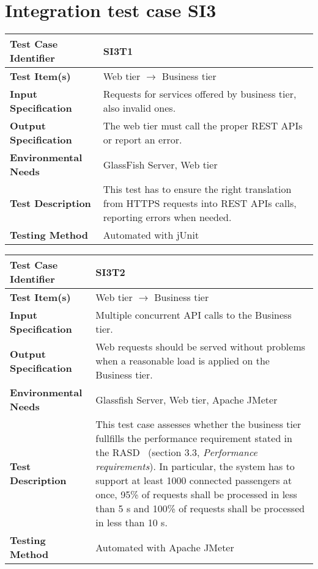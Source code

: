 \vspace{2em}

\section{Integration test case SI3}

\begin{tabular}{l p{}}
    \hline
    \textbf{Test Case Identifier} & SI3T1\\
    \hline
    \textbf{Test Item(s)} & Web tier $\rightarrow$ Business tier\\
    \hline
    \textbf{Input Specification} & Requests for services offered by business tier, also invalid ones.\\
    \hline
    \textbf{Output Specification} & The web tier must call the proper REST APIs or report an error. \\
    \hline
    \textbf{Environmental Needs} & GlassFish Server, Web tier\\
    \hline
    \textbf{Test Description} & This test has to ensure the right translation from HTTPS requests into REST APIs calls, reporting errors when needed.\\
    \hline
    \textbf{Testing Method} & Automated with jUnit \\
    \hline
\end{tabular}

\vspace{2em}

\noindent\begin{tabular}{l p{}}
    \hline
    \textbf{Test Case Identifier} & SI3T2\\
    \hline
    \textbf{Test Item(s)} & Web tier $\rightarrow$ Business tier\\
    \hline
    \textbf{Input Specification} & Multiple concurrent API calls to the Business tier.\\
    \hline
    \textbf{Output Specification} & Web requests should be served without problems when a reasonable load is applied on the Business tier. \\
    \hline
    \textbf{Environmental Needs} & Glassfish Server, Web tier, Apache JMeter\\
    \hline
    \textbf{Test Description} & This test case assesses whether the business tier fullfills the performance requirement stated in the RASD~\cite{mytaxi-rasd} (section 3.3, \emph{Performance requirements}). In particular, the system has to support at least 1000 connected passengers at once, 95\% of requests shall be processed in less than 5 s and 100\% of requests shall be processed in less than 10 s.\\
    \hline
    \textbf{Testing Method} & Automated with Apache JMeter \\
    \hline
\end{tabular}

